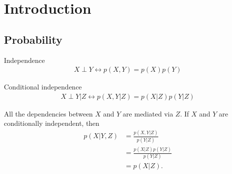 \chapter{Introduction}
\section{Probability}



\begin{definition}{Independence}\vspace{-0.5cm}
	\begin{align*}
	X\perp Y \leftrightarrow p(X,Y)=p(X)p(Y)
	\end{align*}
\end{definition}
\begin{definition}{Conditional independence}\vspace{-0.5cm}
	\begin{align*}
	X\perp Y|Z \leftrightarrow p(X,Y|Z)=p(X|Z)p(Y|Z)
	\end{align*}
\end{definition}
All the dependencies between $X$ and $Y$ are mediated via $Z$. If $X$ and $Y$ are conditionally independent, then 
\begin{align*}
	p(X|Y,Z)&=\frac{p(X,Y|Z)}{p(Y|Z)}\\
	&=\frac{p(X|Z)p(Y|Z)}{p(Y|Z)}\\
	&=p(X|Z).
\end{align*}





